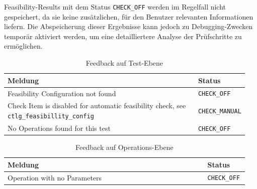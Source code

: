 Feasibility-Results mit dem Status \texttt{CHECK\_OFF} werden im Regelfall nicht gespeichert, da sie keine zusätzlichen, für den Benutzer relevanten Informationen liefern. Die Abspeicherung dieser Ergebnisse kann jedoch zu Debugging-Zwecken temporär aktiviert werden, um eine detailliertere Analyse der Prüfschritte zu ermöglichen.


\begin{table}[!htb]
    \centering
    \caption{Feedback auf Test-Ebene}
    \footnotesize
    \renewcommand{\arraystretch}{1.1} %
    \setlength{\arrayrulewidth}{0.1pt} %
    \begin{tabular}{p{0.8\linewidth} p{0.15\linewidth}}
        \textbf{Meldung} & \textbf{Status} \\
        \midrule
        Feasibility Configuration not found & \texttt{CHECK\_OFF} \\
        \midrule
        Check Item is disabled for automatic feasibility check, see \texttt{ctlg\_feasibillity\_config} & \texttt{CHECK\_MANUAL} \\
        \midrule
        No Operations found for this test & \texttt{CHECK\_OFF} \\
        \bottomrule
    \end{tabular}
    \label{tab:feedback-test}
\end{table}


\begin{table}[!htb]
    \centering
    \caption{Feedback auf Operations-Ebene}
    \footnotesize
    \renewcommand{\arraystretch}{1.1}
    \begin{tabular}{p{0.8\linewidth} p{0.15\linewidth}}
        \textbf{Meldung} & \textbf{Status} \\
        \midrule
        Operation with no Parameters & \texttt{CHECK\_OFF} \\
        \bottomrule
    \end{tabular}
    \label{tab:feedback-operation}
\end{table}


